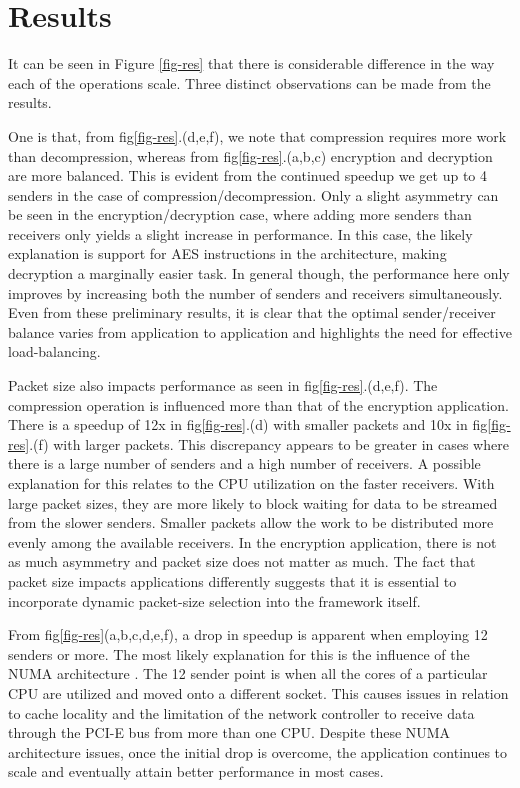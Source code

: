 \documentclass[10pt, conference, compsocconf, reqno]{IEEEtran}
\newcommand{\comment}[1]{}
\begin{document}
\section{Results}
\label{results}
It can be seen in Figure \ref{fig-res} that there is considerable difference in the way each of the operations scale. Three distinct observations can be made from the results.

One is that, from fig\ref{fig-res}.(d,e,f), we note that compression requires more work than decompression, whereas from fig\ref{fig-res}.(a,b,c) encryption and decryption are more balanced. This is evident from the continued speedup we get up to 4 senders in the case of compression/decompression. Only a slight asymmetry can be seen in the encryption/decryption case, where adding more senders than receivers only yields a slight increase in performance. In this case, the likely explanation is support for AES instructions in the architecture, making decryption a marginally easier task. In general though, the performance here only improves by increasing both the number of senders and receivers simultaneously. Even from these preliminary results, it is clear that the optimal sender/receiver balance varies from application to application and highlights the need for effective load-balancing.

Packet size also impacts performance as seen in fig\ref{fig-res}.(d,e,f). The compression operation is influenced more than that of the encryption application. There is a speedup of 12x in fig\ref{fig-res}.(d) with smaller packets and 10x in fig\ref{fig-res}.(f) with larger packets. This discrepancy appears to be greater in cases where there is a large number of senders and a high number of receivers. A possible explanation for this relates to the CPU utilization on the faster receivers. With large packet sizes, they are more likely to block waiting for data to be streamed from the slower senders. Smaller packets allow the work to be distributed more evenly among the available receivers. In the encryption application, there is not as much asymmetry and packet size does not matter as much. The fact that packet size impacts applications differently suggests that it is essential to incorporate dynamic packet-size selection into the framework itself.\comment{ to respond to the unique requirements of each application.}

From fig\ref{fig-res}(a,b,c,d,e,f), a drop in speedup is apparent when employing 12 senders or more. The most likely explanation for this is the influence of the NUMA architecture \cite{Awasthi:2010:HPO:1854273.1854314}. The 12 sender point is when all the cores of a particular CPU are utilized and moved onto a different socket. This causes issues in relation to cache locality and the limitation of the network controller to receive data through the PCI-E bus from more than one CPU. Despite these NUMA architecture issues, once the initial drop is overcome, the application continues to scale and eventually attain better performance in most cases.
\end{document}
